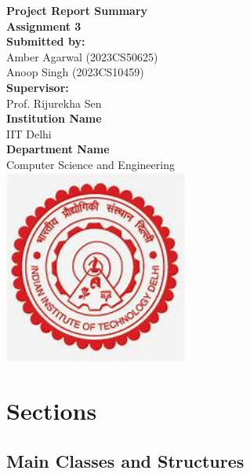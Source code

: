 \documentclass{article}
\date{} %
\begin{document}
\begin{titlepage}
    \centering
    {\LARGE \textbf{Project Report Summary}}\\[1cm]
    {\large \textbf{Assignment 3}}\\[1cm]
    \textbf{Submitted by:} \\ Amber Agarwal (2023CS50625) \\ Anoop Singh (2023CS10459)  \\[0.5cm]
    \textbf{Supervisor:} \\ Prof. Rijurekha Sen \\[1cm]
    \textbf{Institution Name} \\ IIT Delhi \\
    \textbf{Department Name} \\ Computer Science and Engineering  \\[1cm]
    \includegraphics[height=2.5in]{th.jpg}
    \vfill
\end{titlepage}

\tableofcontents
\newpage

\section{Sections}

\subsection{Main Classes and Structures}
\end{document}
